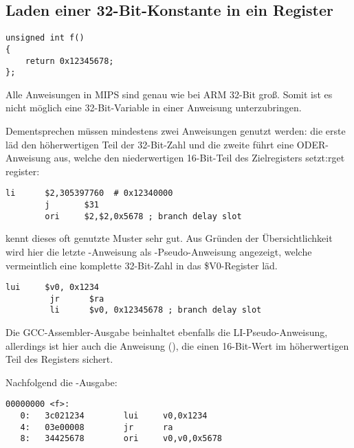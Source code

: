 ﻿\subsection{Laden einer 32-Bit-Konstante in ein Register}
\label{MIPS_big_constants}

\begin{lstlisting}
unsigned int f()
{
	return 0x12345678;
};
\end{lstlisting}

Alle Anweisungen in MIPS sind genau wie bei ARM 32-Bit groß. Somit ist es nicht
möglich eine 32-Bit-Variable in einer Anweisung unterzubringen.

Dementsprechen müssen mindestens zwei Anweisungen genutzt werden:
die erste läd den höherwertigen Teil der 32-Bit-Zahl und die zweite führt eine
ODER-Anweisung aus, welche den niederwertigen 16-Bit-Teil des Zielregisters setzt:rget register:

\begin{lstlisting}[caption=GCC 4.4.5 -O3 (\assemblyOutput)]
        li      $2,305397760  # 0x12340000
        j       $31
        ori     $2,$2,0x5678 ; branch delay slot
\end{lstlisting}

\IDA kennt dieses oft genutzte Muster sehr gut. Aus Gründen der Übersichtlichkeit
wird hier die letzte -Anweisung als -Pseudo-Anweisung angezeigt,
welche vermeintlich eine komplette 32-Bit-Zahl in das \$V0-Register läd.


\begin{lstlisting}[caption=GCC 4.4.5 -O3 (IDA)]
         lui     $v0, 0x1234
         jr      $ra
         li      $v0, 0x12345678 ; branch delay slot
\end{lstlisting}

Die GCC-Assembler-Ausgabe beinhaltet ebenfalls die LI-Pseudo-Anweisung, allerdings
ist hier auch die Anweisung  (), die einen 16-Bit-Wert
im höherwertigen Teil des Registers sichert.

Nachfolgend die -Ausgabe:

\begin{lstlisting}[caption=objdump]
00000000 <f>:
   0:   3c021234        lui     v0,0x1234
   4:   03e00008        jr      ra
   8:   34425678        ori     v0,v0,0x5678
\end{lstlisting}

